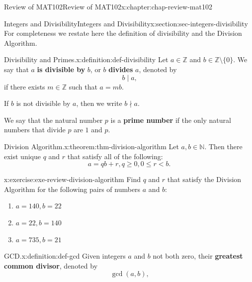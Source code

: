 \documentclass[oneside,10pt,]{book}
\newcommand{\terminology}[1]{\textbf{#1}}
\numberwithin{equation}{section}
\newcommand{\lt}{<}
\begin{document}
\begin{chapterptx}{Review of MAT102}{}{Review of MAT102}{}{}{x:chapter:chap-review-mat102}
\typeout{************************************************}
%
\begin{sectionptx}{Integers and Divisibility}{}{Integers and Divisibility}{}{}{x:section:sec-integers-divisibility}
For completeness we restate here the definition of divisibility and the Division Algorithm.%
\begin{definition}{Divisibility and Primes.}{x:definition:def-divisibility}%
\label{g:notation:id484659} Let \(a \in \mathbb{Z}\) and \(b \in \mathbb{Z} \setminus \{0\}\). We say that \(a\) \terminology{is divisible by} \(b\), or \(b\) \terminology{divides} \(a\), denoted by%
\begin{equation*}
b \mid a\text{,}
\end{equation*}
if there exists \(m \in \mathbb{Z}\) such that \(a = mb\).%
\par
If \(b\) is not divisible by \(a\), then we write \(b \nmid a\).%
\par
We say that the natural number \(p\) is a \terminology{prime number} if the only natural numbers that divide \(p\) are \(1\) and \(p\).%
\end{definition}
\begin{theorem}{Division Algorithm.}{}{x:theorem:thm-division-algorithm}%
Let \(a,b \in \mathbb{N}\). Then there exist unique \(q\) and \(r\) that satisfy all of the following:%
\begin{equation*}
a = qb + r, q \geq 0, 0 \leq r \lt b\text{.}
\end{equation*}
%
\end{theorem}
\begin{inlineexercise}{}{x:exercise:exe-review-division-algorithm}%
Find \(q\) and \(r\) that satisfy the Division Algorithm for the following pairs of numbers \(a\) and \(b\):%
\begin{enumerate}[label=(\alph*)]
\item{}\(\displaystyle a = 140, b = 22\)%
\item{}\(\displaystyle a = 22, b = 140\)%
\item{}\(\displaystyle a = 735, b = 21\)%
\end{enumerate}
%
\end{inlineexercise}
\begin{definition}{GCD.}{x:definition:def-gcd}%
\label{g:notation:id484823} Given integers \(a\) and \(b\) not both zero, their \terminology{greatest common divisor}, denoted by%
\begin{equation*}
\gcd(a,b)\text{,}

\end{equation*}
\end{definition}
\end{sectionptx}
\end{chapterptx}
\end{document}
